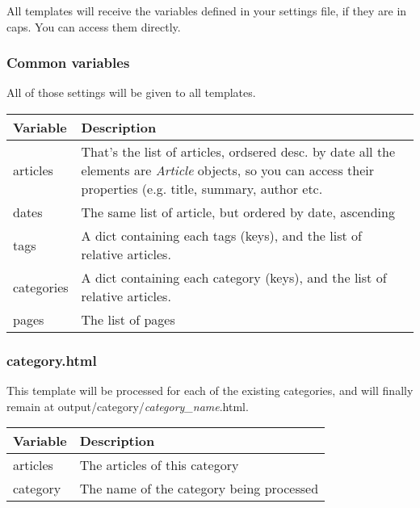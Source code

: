 \documentclass[letterpaper,10pt,english]{manual}
\begin{document}
All templates will receive the variables defined in your settings file, if they
are in caps. You can access them directly.


\subsubsection{Common variables}

All of those settings will be given to all templates.

\begin{tabulary}{\textwidth}{|L|L|}
\hline
\textbf{
Variable
} & \textbf{
Description
}\\
\hline

articles
 & 
That's the list of articles, ordsered desc. by date
all the elements are \emph{Article} objects, so you can
access their properties (e.g. title, summary, author
etc.
\\

dates
 & 
The same list of article, but ordered by date,
ascending
\\

tags
 & 
A dict containing each tags (keys), and the list of
relative articles.
\\

categories
 & 
A dict containing each category (keys), and the
list of relative articles.
\\

pages
 & 
The list of pages
\\
\hline
\end{tabulary}



\subsubsection{category.html}

This template will be processed for each of the existing categories, and will
finally remain at output/category/\emph{category\_name}.html.

\begin{tabulary}{\textwidth}{|L|L|}
\hline
\textbf{
Variable
} & \textbf{
Description
}\\
\hline

articles
 & 
The articles of this category
\\

category
 & 
The name of the category being processed
\\
\hline
\end{tabulary}
\end{document}
